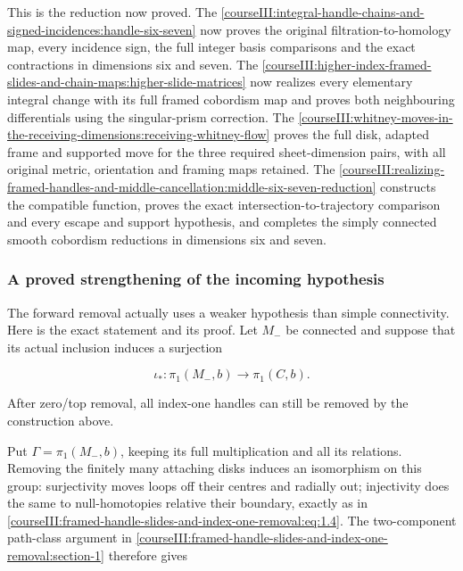 This is the reduction now proved. The \cref{courseIII:integral-handle-chains-and-signed-incidences:handle-six-seven} now proves the original filtration-to-homology map, every incidence sign, the full integer basis comparisons and the exact contractions in dimensions six and seven. The \cref{courseIII:higher-index-framed-slides-and-chain-maps:higher-slide-matrices} now realizes every elementary integral change with its full framed cobordism map and proves both neighbouring differentials using the singular-prism correction. The \cref{courseIII:whitney-moves-in-the-receiving-dimensions:receiving-whitney-flow} proves the full disk, adapted frame and supported move for the three required sheet-dimension pairs, with all original metric, orientation and framing maps retained. The \cref{courseIII:realizing-framed-handles-and-middle-cancellation:middle-six-seven-reduction} constructs the compatible function, proves the exact intersection-to-trajectory comparison and every escape and support hypothesis, and completes the simply connected smooth cobordism reductions in dimensions six and seven.

\subsubsection{A proved strengthening of the incoming hypothesis}
\label{courseIII:framed-handle-slides-and-index-one-removal:section-8.1}

The forward removal actually uses a weaker hypothesis than simple connectivity. Here is the exact statement and its proof. Let \(M_-\) be connected and suppose that its actual inclusion induces a surjection

\begin{equation}
\iota_*:\pi_1(M_-,b)\longrightarrow\pi_1(C,b).
 \label{courseIII:framed-handle-slides-and-index-one-removal:eq:8.6}
\end{equation}

After zero/top removal, all index-one handles can still be removed by the construction above.

Put \(\Gamma=\pi_1(M_-,b)\), keeping its full multiplication and all its relations. Removing the finitely many attaching disks induces an isomorphism on this group: surjectivity moves loops off their centres and radially out; injectivity does the same to null-homotopies relative their boundary, exactly as in \eqref{courseIII:framed-handle-slides-and-index-one-removal:eq:1.4}. The two-component path-class argument in \cref{courseIII:framed-handle-slides-and-index-one-removal:section-1} therefore gives


